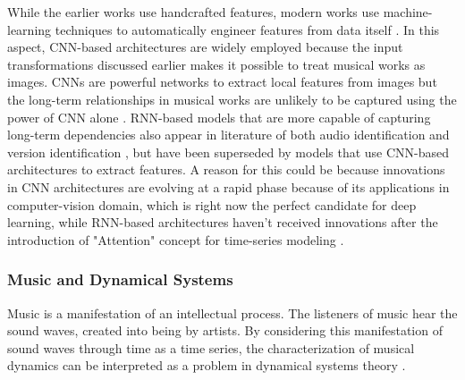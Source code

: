\documentclass[../main.tex]{subfiles}
\begin{document}
\par
While the earlier works use handcrafted features, modern works use machine-learning techniques to automatically engineer features from data itself \cite{arcas_now_2017,yuTemporalPyramidPooling2019,baez_suarez_unsupervised_2020,yu_contrastive_2020,dorasCoverDetectionUsing2019,jiang_yang_chen_2020,yesilerAccurateScalableVersion2020,yesilerLessMoreFaster2020,yeSupervisedDeepHashing2019b,yuTemporalPyramidPooling2019}. In this aspect, \gls{CNN}-based architectures are widely employed because the input transformations discussed earlier makes it possible to treat musical works as images. \gls{CNN}s are powerful networks to extract local features from images but the long-term relationships in musical works are unlikely to be captured using the power of \gls{CNN} alone \cite{yesilerAccurateScalableVersion2020}. \gls{RNN}-based models that are more capable of capturing long-term dependencies also appear in literature of both audio identification \cite{baez_suarez_unsupervised_2020} and version identification \cite{yeSupervisedDeepHashing2019b}, but have been superseded by models that use \gls{CNN}-based architectures to extract features. A reason for this could be because innovations in \gls{CNN} architectures are evolving at a rapid phase because of its applications in computer-vision domain, which is right now the perfect candidate for deep learning, while \gls{RNN}-based architectures haven't received innovations after the introduction of "Attention" concept for time-series modeling \cite{vaswaniAttentionAllYou2017}.

\subsubsection{Music and Dynamical Systems}

\par
Music is a manifestation of an intellectual process. The listeners of music hear the sound waves, created into being by artists. By considering this manifestation of sound waves through time as a time series, the characterization of musical dynamics can be interpreted as a problem in dynamical systems theory \cite{complex_dynamics}. 
\end{document}

